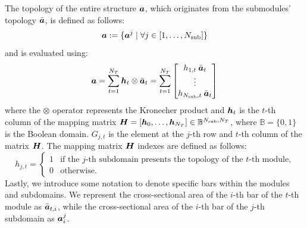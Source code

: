 The topology of the entire structure $\bm{a}$, which originates from the submodules' topology $\bar{\bm{a}}$, is defined as follows:
\begin{equation}
    \bm{a} :=  \{\bm{a}^j \;|\; \forall j \in [1,\dots,N_{\text{sub}}]\}
\end{equation}
and is evaluated using:
\begin{equation}
    \bm{a} = \sum_{t=1}^{N_T} \bm{h}_t\otimes\bar{\bm{a}}_t = \sum_{t=1}^{N_T} \begin{bmatrix}
        h_{1,t} \: \bar{\bm{a}}_t \\
        \vdots\\
        h_{N_{\text{sub}},t} \: \bar{\bm{a}}_t 
        \end{bmatrix}
        \label{eq:05_VL}
\end{equation}
where the $\otimes$ operator represents the Kronecher product and $\bm{h}_{t}$ is the $t$-th column of the mapping matrix $\bm{H} = [\bm{h}_0,\dots,\bm{h}_{N_T}] \in \mathbb{B}^{N_{\text{sub}},N_T}$, where $\mathbb{B}=\lbrace 0,1 \rbrace$ is the Boolean domain. $G_{j,t}$ is the element at the $j$-th row and $t$-th column of the matrix $\bm{H}$. The mapping matrix $\bm{H}$ indexes are defined as follows:
\begin{equation}
    h_{j,t} =
    \begin{cases}
      1 & \text{if the $j$-th subdomain presents the topology of the $t$-th module,} \\
      0 & \text{otherwise.} 
    \end{cases}
\end{equation}
Lastly, we introduce some notation to denote specific bars within the modules and subdomains. We represent the cross-sectional area of the $i$-th bar of the $t$-th module as $\bar{\bm{a}}_{t,i}$, while the cross-sectional area of the $i$-th bar of the $j$-th subdomain as $\bm{a}^j_i$.
